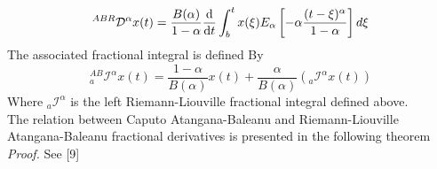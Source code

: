 \documentclass[twoside]{book}
\begin{document}
{\begin{equation}
    \label{atangana derivative RL}
    ^{ABR}\mathcal{D}^{\alpha} x(t) = \frac{B(\alpha)}{1-\alpha}\dv{}{t} \int_b^t x(\xi) E_{\alpha}\left[ -\alpha \frac{(t-\xi)^\alpha}{1-\alpha} \right] d\xi
\end{equation}
The associated fractional integral is defined By
\begin{equation}
    \label{associated}
    ^{AB}_{a}\mathscr{I}^{\alpha} x(t) = \frac{1-\alpha}{B(\alpha)} x(t) + \frac{\alpha}{B(\alpha)} (_{a}\mathscr{I}^{\alpha}x(t))
\end{equation}
Where $_{a} \mathscr{I}^{\alpha} $ is the left Riemann-Liouville fractional integral defined above.\\
\newline
The relation between Caputo Atangana-Baleanu and Riemann-Liouville\\
Atangana-Baleanu fractional derivatives is presented in the following theorem
\textit{Proof.} See [9]\\
\newline


}
\end{document}
